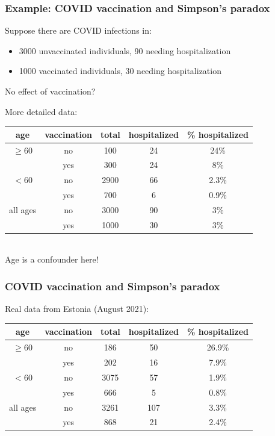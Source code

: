 \documentclass[10pt,dvipsnames,t ,handout%
,aspectratio=169%
]{beamer}%
\begin{document}
\begin{frame}
	\frametitle{Example: COVID vaccination and Simpson's paradox}
\begin{block}{Suppose there are COVID infections in:}
\begin{itemize}
\item 3000 unvaccinated individuals, 90 needing hospitalization
\item 1000 vaccinated individuals, 30 needing hospitalization
\end{itemize}
\alert{No effect of vaccination?} 
\end{block} 
\pause 
	More detailed data: \\[0.2cm]
\begin{tabular}{|c|c|c|c|c|}
	\hline 
	age & vaccination & total & hospitalized & \% hospitalized \\
	\hline  
	$\ge 60$  & no & 100 & 24 & 24\% \\
	& yes & 300 & 24 & 8\% \\
	\hline 
	$<60$  & no & 2900 & 66 & 2.3\% \\
	& yes & 700 & 6 & 0.9\% \\
	\hline 
	all ages & no & 3000 & 90 & 3\% \\
	& yes & 1000 & 30 & 3\% \\
	\hline 	
\end{tabular}
\mbox{}\\[0.2cm]

	\alert{Age is a confounder here!}

\end{frame}

\begin{frame}
	\frametitle{COVID vaccination and Simpson's paradox}
	Real data from Estonia (August 2021): \\[0.2cm]
	\begin{tabular}{|c|c|c|c|c|}
		\hline 
		age & vaccination & total & hospitalized & \% hospitalized \\
		\hline  
	$\ge 60$  & no & 186 & 50 & 26.9\% \\
          & yes & 202 & 16 & 7.9\% \\
	\hline 
	$<60$  & no & 3075 & 57 & 1.9\% \\
	       & yes & 666 & 5 & 0.8\% \\
	\hline 
    all ages & no & 3261 & 107 & 3.3\% \\
               & yes & 868 & 21 & 2.4\% \\
\hline 	
\end{tabular}
\mbox{}\\
\end{frame}
\end{document}
